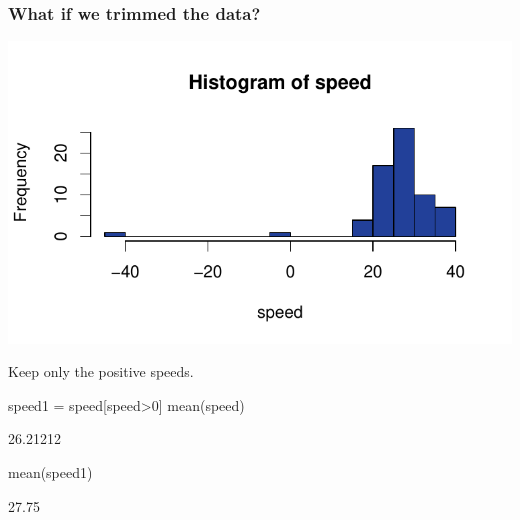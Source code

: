 \documentclass[a4paper]{article}\usepackage[]{graphicx}\usepackage[]{xcolor}
\makeatletter
\def\maxwidth{ %
  \ifdim\Gin@nat@width>\linewidth
    \linewidth
  \else
    \Gin@nat@width
  \fi
}
\makeatother
\begin{document}
\subsubsection{What if we trimmed the data?}
\begin{Schunk}


{\centering \includegraphics[width=\maxwidth]{figure/listings-unnamed-chunk-170-1} 

}

\end{Schunk}
Keep only the positive speeds.
\begin{Schunk}
\begin{Sinput}
speed1 = speed[speed>0]
mean(speed)
\end{Sinput}
\begin{Soutput}
[1] 26.21212
\end{Soutput}
\begin{Sinput}
mean(speed1)
\end{Sinput}
\begin{Soutput}
[1] 27.75
\end{Soutput}
\end{Schunk}
\end{document}
